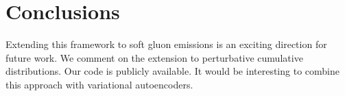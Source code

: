 \section{Conclusions}\label{sec:conclusions}

Extending this framework to soft gluon emissions is an exciting
direction for future work. We comment on the extension to perturbative
cumulative distributions. Our code is publicly available. It would be
interesting to combine this approach with variational autoencoders.

